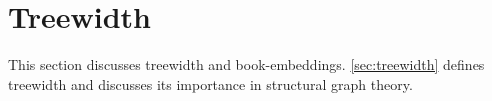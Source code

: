 \section{Treewidth}\label{chap:treewidth}
This section discusses treewidth and book-embeddings. \cref{sec:treewidth} defines treewidth and discusses its importance in structural graph theory. 


